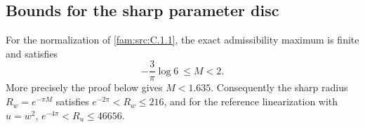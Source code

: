 \subsection{Bounds for the sharp parameter disc}\label{fam:section:C.2}
\begin{proposition}\label{fam:src:C.2.1}\label{fam:st:C.2.1}
For the normalization of \ref{fam:src:C.1.1}, the exact admissibility maximum is finite
and satisfies
\[
 -\frac3\pi\log6\ \leq M<2.
\]
More precisely the proof below gives \(M<1.635\). Consequently the sharp
radius \(R_w=e^{-\pi M}\) satisfies
\(e^{-2\pi}<R_w\leq216\), and for the reference linearization with
\(u=w^2\), \(e^{-4\pi}<R_u\leq46656\).
\end{proposition}

